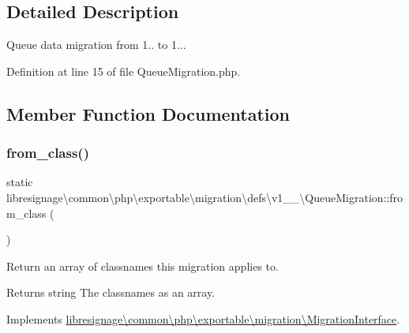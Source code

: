 \subsection{Detailed Description}
Queue data migration from 1.. to 1... 

Definition at line 15 of file Queue\+Migration.\+php.



\subsection{Member Function Documentation}
\mbox{\label{classlibresignage_1_1common_1_1php_1_1exportable_1_1migration_1_1defs_1_1v1__0__0_1_1QueueMigration_ac765391ac04bd8c5b4917f4ba6a3a7db}} 
\subsubsection{\texorpdfstring{from\+\_\+class()}{from\_class()}}
{\footnotesize\ttfamily static libresignage\textbackslash{}common\textbackslash{}php\textbackslash{}exportable\textbackslash{}migration\textbackslash{}defs\textbackslash{}v1\+\_\+\_\textbackslash{}\+Queue\+Migration\+::from\+\_\+class (\begin{DoxyParamCaption}{ }\end{DoxyParamCaption})\hspace{0.3cm}{\ttfamily [static]}}

Return an array of classnames this migration applies to.

\begin{DoxyReturn}{Returns}
string The classnames as an array. 
\end{DoxyReturn}


Implements \hyperlink{interfacelibresignage_1_1common_1_1php_1_1exportable_1_1migration_1_1MigrationInterface_aa8eb2e4ff59358ae551061687540f724}{libresignage\textbackslash{}common\textbackslash{}php\textbackslash{}exportable\textbackslash{}migration\textbackslash{}\+Migration\+Interface}.



